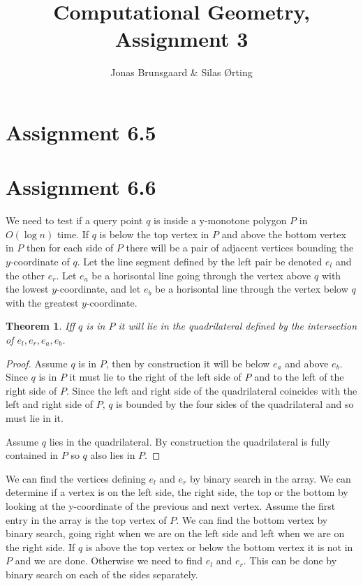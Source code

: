 \documentclass[10pt,a4paper,final,oneside,openany,article]{memoir}
\title{Computational Geometry, Assignment 3}
\author{
    Jonas Brunsgaard \& Silas Ørting
}
\newtheorem{pinQ}{Theorem}
\begin{document}
\maketitle

\chapter*{Assignment 6.5}


\chapter*{Assignment 6.6}
We need to test if a query point $q$ is inside a y-monotone polygon $P$ in $O(\log n)$ time. If $q$ is below the top vertex in $P$ and above the bottom vertex in $P$ then for each side of $P$ there will be a pair of adjacent vertices bounding the $y$-coordinate of $q$. Let the line segment defined by the left pair be denoted $e_l$ and the other $e_r$. Let $e_a$ be a horisontal line going through the vertex above $q$ with the lowest $y$-coordinate, and let $e_b$ be a horisontal line through the vertex below $q$ with the greatest $y$-coordinate. 

\begin{pinQ}
  Iff $q$ is in $P$ it will lie in the quadrilateral defined by the intersection of $e_l, e_r, e_a, e_b$.  
\end{pinQ}

\begin{proof}
  Assume $q$ is in $P$, then by construction it will be below $e_a$ and above $e_b$. Since $q$ is in $P$ it must lie to the right of the left side of $P$ and to the left of the right side of $P$. Since the left and right side of the quadrilateral coincides with the left and right side of $P$, $q$ is bounded by the four sides of the quadrilateral and so must lie in it.
  
  Assume $q$ lies in the quadrilateral. By construction the quadrilateral is fully contained in $P$ so $q$ also lies in $P$.
\end{proof}

We can find the vertices defining $e_l$ and $e_r$ by binary search in the array.
We can determine if a vertex is on the left side, the right side, the top or the bottom by looking at the y-coordinate of the previous and next vertex. 
Assume the first entry in the array is the top vertex of $P$. We can find the bottom vertex by binary search, going right when we are on the left side and left when we are on the right side. If $q$ is above the top vertex or below the bottom vertex it is not in $P$ and we are done. Otherwise we need to find $e_l$ and $e_r$. This can be done by binary search on each of the sides separately. 
\end{document}
